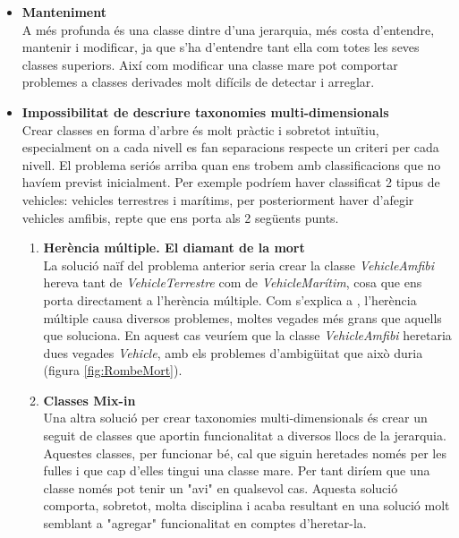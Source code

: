 \begin{itemize}
  \item {\bf Manteniment} \hfill \\
    A més profunda és una classe dintre d'una jerarquia, més costa d'entendre, mantenir i modificar, ja que s'ha d'entendre tant ella com totes les seves classes superiors. Així com modificar una classe mare pot comportar problemes  a classes derivades molt difícils de detectar i arreglar.
    
  \item {\bf Impossibilitat de descriure taxonomies multi-dimensionals} \hfill \\
    Crear classes en forma d'arbre és molt pràctic i sobretot intuïtiu, especialment on a cada nivell es fan separacions respecte un criteri per cada nivell. El problema seriós arriba quan ens trobem amb classificacions que no havíem previst inicialment. Per exemple podríem haver classificat 2 tipus de vehicles: vehicles terrestres i marítims, per posteriorment haver d'afegir vehicles amfibis, repte que ens porta als 2 següents punts.
    \begin{enumerate}
      \item {\bf Herència múltiple. El diamant de la mort} \hfill \\
        La solució naïf del problema anterior seria crear la classe {\em VehicleAmfibi} hereva tant de {\em VehicleTerrestre} com de {\em VehicleMarítim}, cosa que ens porta directament a l'herència múltiple. Com s'explica a \cite[p.~2]{Martin97}, l'herència múltiple causa diversos problemes, moltes vegades més grans que aquells que soluciona. En aquest cas veuríem que la classe {\em VehicleAmfibi} heretaria dues vegades {\em Vehicle}, amb els problemes d'ambigüitat que això duria (figura \ref{fig:RombeMort}).
        
      \item {\bf Classes Mix-in} \hfill \\
        Una altra solució per crear taxonomies multi-dimensionals és crear un seguit de classes que aportin funcionalitat a diversos llocs de la jerarquia. Aquestes classes, per funcionar bé, cal que siguin heretades només per les fulles i que cap d'elles tingui una classe mare. Per tant diríem que una classe només pot tenir un "avi" en qualsevol cas. Aquesta solució comporta, sobretot, molta disciplina i acaba resultant en una solució molt semblant a "agregar" funcionalitat en comptes d'heretar-la.
        

\end{enumerate}
\end{itemize}
